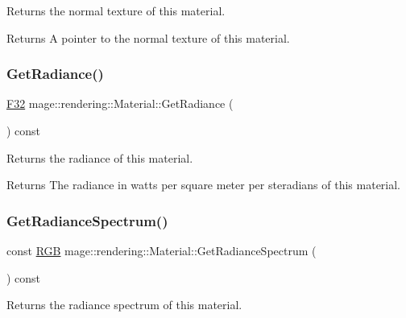 Returns the normal texture of this material.

\begin{DoxyReturn}{Returns}
A pointer to the normal texture of this material. 
\end{DoxyReturn}
\hypertarget{classmage_1_1rendering_1_1_material_a5bfbc1bc67731126af7cf33b286bb07b}{}\label{classmage_1_1rendering_1_1_material_a5bfbc1bc67731126af7cf33b286bb07b} 
\subsubsection{\texorpdfstring{Get\+Radiance()}{GetRadiance()}}
{\footnotesize\ttfamily \hyperlink{namespacemage_aa97e833b45f06d60a0a9c4fc22ae02c0}{F32} mage\+::rendering\+::\+Material\+::\+Get\+Radiance (\begin{DoxyParamCaption}{ }\end{DoxyParamCaption}) const\hspace{0.3cm}{\ttfamily [noexcept]}}

Returns the radiance of this material.

\begin{DoxyReturn}{Returns}
The radiance in watts per square meter per steradians of this material. 
\end{DoxyReturn}
\hypertarget{classmage_1_1rendering_1_1_material_af8a3171b34409593673f1279e3f9ba29}{}\label{classmage_1_1rendering_1_1_material_af8a3171b34409593673f1279e3f9ba29} 
\subsubsection{\texorpdfstring{Get\+Radiance\+Spectrum()}{GetRadianceSpectrum()}}
{\footnotesize\ttfamily const \hyperlink{structmage_1_1_r_g_b}{R\+GB} mage\+::rendering\+::\+Material\+::\+Get\+Radiance\+Spectrum (\begin{DoxyParamCaption}{ }\end{DoxyParamCaption}) const\hspace{0.3cm}{\ttfamily [noexcept]}}

Returns the radiance spectrum of this material.

